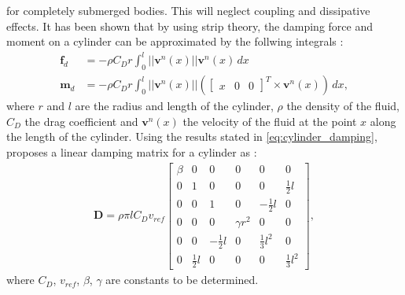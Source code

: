 for completely submerged bodies. This will neglect coupling and dissipative effects.
It has been shown that by using strip theory, the damping force and
moment on a cylinder can be approximated by the follwing integrals \cite{mcmillan1995}:
\begin{subequations}
    \label{eq:cylinder_damping}
    \begin{align}
        \bm{f}_d &= - \rho C_D r \int_{0}^{l} ||\bm{v}^n(x)|| \bm{v}^n(x) \,dx \\
        \bm{m}_d &= - \rho C_D r \int_{0}^{l} ||\bm{v}^n(x)||
        \left(\begin{bmatrix}x & 0 & 0\end{bmatrix}^T \times \bm{v}^n(x)\right) \,dx,
    \end{align}
\end{subequations}
where $r$ and $l$ are the radius and length of the cylinder, $\rho$ the density
of the fluid, $C_D$ the drag coefficient and $\bm{v}^n(x)$ the velocity of the
fluid at the point $x$ along the length of the cylinder. Using the results stated
in \autoref{eq:cylinder_damping}, \citeauthor{schmidt2018} proposes a linear
damping matrix for a cylinder as \cite{schmidt2018}:
\begin{align}
    \bm{D} = \rho \pi l C_D v_{ref}
    \begin{bmatrix}
        \beta &            0 &             0 &          0 &              0 &            0 \\
            0 &            1 &             0 &          0 &              0 & \frac{1}{2}l \\
            0 &            0 &             1 &          0 &  -\frac{1}{2}l &            0 \\
            0 &            0 &             0 & \gamma r^2 &              0 &            0 \\
            0 &            0 & -\frac{1}{2}l &          0 & \frac{1}{3}l^2 &            0 \\
            0 & \frac{1}{2}l &             0 &          0 &              0 & \frac{1}{3}l^2
    \end{bmatrix},
\label{eq:damping_cyl}
\end{align}
where $C_D$, $v_{ref}$, $\beta$, $\gamma$ are constants to be determined.
